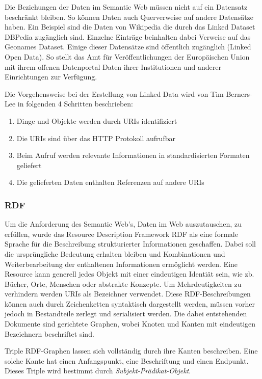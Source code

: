 Die Beziehungen der Daten im Semantic Web müssen nicht auf ein Datensatz beschränkt bleiben. So können Daten auch Querverweise auf andere Datensätze haben. Ein Beispiel sind die Daten von Wikipedia die durch das Linked Dataset DBPedia zugänglich sind. Einzelne Einträge beinhalten dabei Verweise auf das Geonames Dataset.
Einige dieser Datensätze sind öffentlich zugänglich (Linked Open Data). So stellt das Amt für Veröffentlichungen der Europäischen Union mit ihrem offenen Datenportal Daten ihrer Institutionen und anderer Einrichtungen zur Verfügung. \newline
 
Die Vorgehensweise bei der Erstellung von Linked Data wird von Tim Berners-Lee\cite{ld} in folgenden 4 Schritten beschrieben:

\begin{enumerate}
	\item Dinge und Objekte werden durch URIs identifiziert
	\item Die URIs sind über das HTTP Protokoll aufrufbar
	\item Beim Aufruf werden relevante Informationen in standardisierten Formaten geliefert
	\item Die gelieferten Daten enthalten Referenzen auf andere URIs
\end{enumerate}
\subsubsection{RDF}

Um die Anforderung des Semantic Web’s, Daten im Web auszutauschen, zu erfüllen, wurde das Resource Description Framework RDF als eine formale Sprache für die Beschreibung strukturierter Informationen geschaffen. Dabei soll die ursprüngliche Bedeutung erhalten bleiben und Kombinationen und Weiterbearbeitung der enthaltenen Informationen ermöglicht werden.
Eine Resource kann generell jedes Objekt mit einer eindeutigen Identiät sein, wie zb. Bücher, Orte, Menschen oder abstrakte Konzepte. Um Mehrdeutigkeiten zu verhindern werden URIs als Bezeichner verwendet. Diese RDF-Beschreibungen können auch durch Zeichenketten syntaktisch dargestellt werden, müssen vorher jedoch in Bestandteile zerlegt und serialisiert werden. Die dabei entstehenden Dokumente sind gerichtete Graphen, wobei Knoten und Kanten mit eindeutigen Bezeichnern beschriftet sind. \newline
 
Triple RDF-Graphen lassen sich vollständig durch ihre Kanten beschreiben. Eine solche Kante hat einen Anfangspunkt, eine Beschriftung und einen Endpunkt. Dieses Triple wird bestimmt durch \emph{Subjekt-Prädikat-Objekt}.

